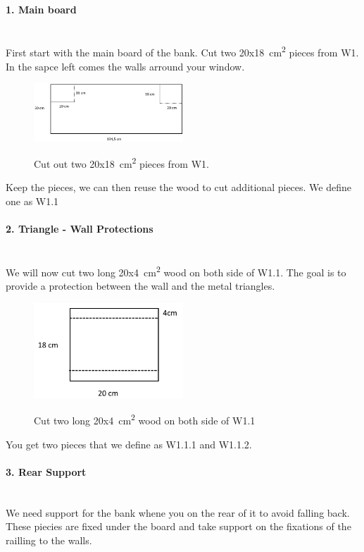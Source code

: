 \documentclass{subfiles}
\begin{document}
    \paragraph{1. Main board}$~$\\
    First start with the main board of the bank. Cut two 20x18\SI{}{\square\centi\meter} pieces from W1.
    In the sapce left comes the walls arround your window.
    \begin{figure}[h]
        \centering
        \includegraphics[width=0.5\textwidth]{Ressources/Cut_W1.png}
        \label{fig:Cut_W1}
        \caption{Cut out two 20x18\SI{}{\square\centi\meter} pieces from W1. }
    \end{figure}
    Keep the pieces, we can then reuse the wood to cut additional pieces. We define one as W1.1


    \paragraph{2. Triangle - Wall Protections}$~$\\
    We will now cut two long 20x4\SI{}{\square\centi\meter} wood on both side of W1.1. The goal is to 
    provide a protection between the wall and the metal triangles.
    \begin{figure}[h]
        \centering
        \includegraphics[width=0.5\textwidth]{Ressources/Cut_W1_1.png}
        \label{fig:Cut_W1_1}
        \caption{Cut two long 20x4\SI{}{\square\centi\meter} wood on both side of W1.1}
    \end{figure}
    You get two pieces that we define as W1.1.1 and W1.1.2.

    \paragraph{3. Rear Support}$~$\\
    We need support for the bank whene you on the rear of it to avoid falling back. 
    These piecies are fixed under the board and take support on the fixations of the railling to the walls. \newline
    
\end{document}
